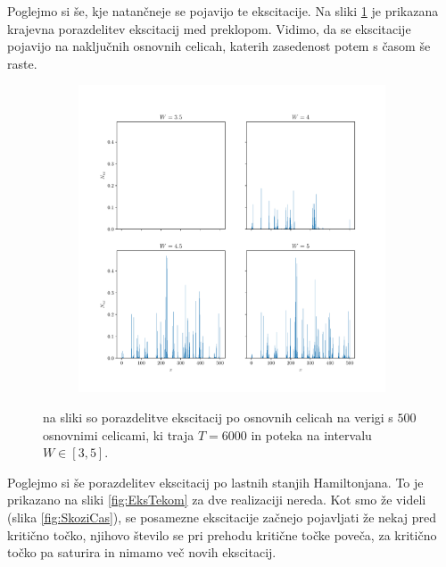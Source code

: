 Poglejmo si še, kje natančneje se pojavijo te ekscitacije. Na sliki \ref{fig:Krajevne} je prikazana krajevna porazdelitev ekscitacij med preklopom. Vidimo, da se ekscitacije pojavijo na naključnih osnovnih celicah, katerih zasedenost potem s časom še raste.
\begin{figure}[!h]
\centering
\begin{subfigure}{.99\textwidth}
\includegraphics[width=\linewidth]{Figures/KrajevneEksitacijeNoGrid.pdf}
\end{subfigure}
\caption{na sliki so porazdelitve ekscitacij po osnovnih celicah na verigi s $500$ osnovnimi celicami, ki traja $T=6000$ in poteka na intervalu $W \in [3,5]$.}
\label{fig:Krajevne}
\end{figure}
\newpage
Poglejmo si še porazdelitev ekscitacij po lastnih stanjih Hamiltonjana. To je prikazano na sliki \ref{fig:EksTekom} za dve realizaciji nereda. Kot smo že videli (slika \ref{fig:SkoziCas}), se posamezne ekscitacije začnejo pojavljati že nekaj pred kritično točko, njihovo število se pri prehodu kritične točke poveča, za kritično točko pa saturira in nimamo več novih ekscitacij. 

